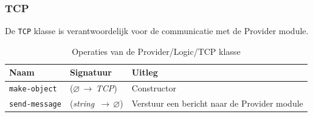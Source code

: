 \documentclass[a4paper, 11pt]{article}
\newcommand{\naar}{\,$\rightarrow$\,}
\renewcommand{\empty}{$\varnothing$}
\newcommand{\<}{\scriptsize\textless\normalsize}
\renewcommand{\>}{\scriptsize\textgreater\normalsize}
\begin{document}
\subsubsection{TCP} %
De \texttt{TCP} klasse is verantwoordelijk voor de communicatie met de Provider module.
\begin{table}[H]
	\begin{center}
		\begin{tabular}{|l l l|}
			\hline
			\textbf{Naam} & \textbf{Signatuur} & \textbf{Uitleg}\\
			\hline
			\texttt{make-object} & (\empty \naar \textit{TCP}) & Constructor\\
			\hline
			\texttt{send-message} & (\textit{string} \naar \empty) & Verstuur een bericht naar de Provider module\\
			\hline
		\end{tabular}
		\caption{Operaties van de Provider/Logic/TCP klasse}
	\end{center}
\end{table}

\newpage
\end{document}
